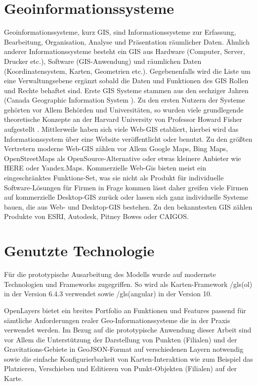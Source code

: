 \section{Geoinformationssysteme}
Geoinformationssysteme, kurz GIS, sind Informationssysteme zur Erfassung, Bearbeitung, Organisation, Analyse und Präsentation räumlicher Daten.  
Ähnlich anderer Informationssysteme besteht ein GIS aus Hardware (Computer, Server, Drucker etc.), Software (GIS-Anwendung) und räumlichen Daten (Koordinatensystem, Karten, Geometrien etc.). 
Gegebenenfalls wird die Liste um eine Verwaltungsebene ergänzt sobald die Daten und Funktionen des GIS Rollen und Rechte behaftet sind.
Erste GIS Systeme stammen aus den sechziger Jahren (Canada Geographic Information System \cite{esriCGIS}). 
Zu den ersten Nutzern der Systeme gehörten vor Allem Behörden und Universitäten, so wurden viele grundlegende theoretische Konzepte an der Harvard University von Professor Howard Fisher aufgestellt \cite{fisher1979}.
Mittlerweile haben sich viele Web-GIS etabliert, hierbei wird das Informationssystem über eine Website veröffentlicht oder benutzt. 
Zu den größten Vertretern moderne Web-GIS zählen vor Allem Google Maps, Bing Maps, OpenStreetMaps als OpenSource-Alternative oder etwas kleinere Anbieter wie HERE oder Yandex.Maps.
Kommerzielle Web-Gis bieten meist ein eingeschränktes Funktions-Set, was sie nicht als Produkt für individuelle Software-Lösungen für Firmen in Frage kommen lässt daher greifen viele Firmen auf kommerzielle Desktop-GIS zurück oder lassen sich ganz individuelle Systeme bauen, die aus Web- und Desktop-GIS bestehen.
Zu den bekanntesten GIS zählen Produkte von ESRI, Autodesk, Pitney Bowes oder CAIGOS. 
\section{Genutzte Technologie}
Für die prototypische Ausarbeitung des Modells wurde auf modernste Technologien und Frameworks zugegriffen. So wird als Karten-Framework /gls(ol) in der Version 6.4.3 verwendet sowie /gls(angular) in der Version 10.

OpenLayers bietet ein breites Portfolio an Funktionen und Features passend für sämtliche Anforderungen realer Geo-Informationssysteme die in der Praxis verwendet werden. Im Bezug auf die prototypische Anwendung dieser Arbeit sind vor Allem die Unterstützung der Darstellung von Punkten (Filialen) und der Gravitations-Gebiete in GeoJSON-Format auf verschiedenen Layern notwendig sowie die einfache Konfigurierbarkeit von Karten-Interaktion wie zum Beispiel das Platzieren, Verschieben und Editieren von Punkt-Objekten (Filialen) auf der Karte.

